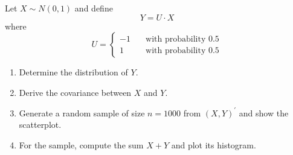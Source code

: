 \documentclass{article}
\begin{document}
Let $X\sim N(0,1)$ and define%
\begin{equation*}
Y=U\cdot X
\end{equation*}%
where%
\begin{equation*}
U=\left\{
\begin{array}{cc}
-1 & \quad \text{with probability 0.5} \\
1 & \quad \text{with probability 0.5}%
\end{array}%
\right.
\end{equation*}

\begin{enumerate}
\item Determine the distribution of $Y$.

\item Derive the covariance between $X$ and $Y$.

\item Generate a random sample of size $n=1000$ from $(X,Y)^{\prime }$ and
show the scatterplot.

\item For the sample, compute the sum $X+Y$ and plot its histogram.
\end{enumerate}
\end{document}
